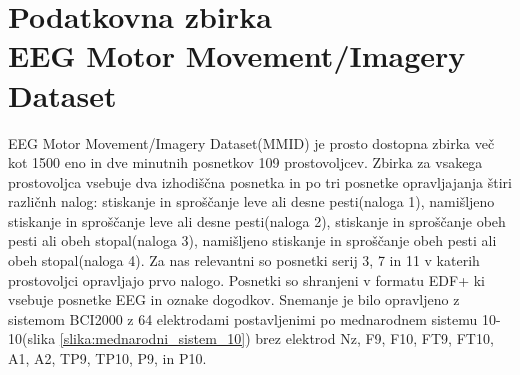 \section{Podatkovna zbirka\\ EEG Motor Movement/Imagery Dataset}
EEG Motor Movement/Imagery Dataset(MMID) je prosto dostopna zbirka več kot 1500 eno in dve minutnih posnetkov 109 prostovoljcev. Zbirka za vsakega prostovoljca vsebuje dva izhodiščna posnetka in po tri posnetke opravljajanja štiri različnh nalog: stiskanje in sproščanje leve ali desne pesti(naloga 1), namišljeno stiskanje in sproščanje leve ali desne pesti(naloga 2), stiskanje in sproščanje obeh pesti ali obeh stopal(naloga 3), namišljeno stiskanje in sproščanje obeh pesti ali obeh stopal(naloga 4). Za nas relevantni so posnetki serij 3, 7 in 11 v katerih prostovoljci opravljajo prvo nalogo. Posnetki so shranjeni v formatu EDF+ ki vsebuje posnetke EEG in oznake dogodkov. Snemanje je bilo opravljeno z sistemom BCI2000 z 64 elektrodami postavljenimi po mednarodnem sistemu 10-10(slika \ref{slika:mednarodni_sistem_10}) brez elektrod Nz, F9, F10, FT9, FT10, A1, A2, TP9, TP10, P9, in P10.\cite{schalkBCI2000GeneralpurposeBraincomputer2004,schalkEEGMotorMovement2009}


